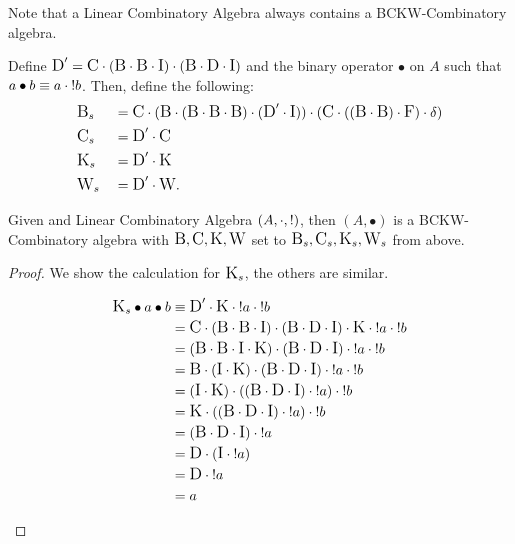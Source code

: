 Note that a Linear Combinatory Algebra always contains a BCKW-Combinatory algebra.

Define $\Dc' = \Cc\.(\Bc\.\Bc\.\Ic)\.(\Bc\.\Dc\.\Ic)$ and the binary operator $\bullet$ on $A$ such
that $a\bullet b \equiv a\.{!}b$. Then, define the following:
\begin{align*}
  &\Bc_s  &&=\Cc\.(\Bc\.(\Bc\.\Bc\.\Bc)\.(\Dc'\.\Ic))\.(\Cc\.((\Bc\.\Bc)\.\Fc)\.\dc)\\
  &\Cc_s  &&=\Dc'\.\Cc\\
  &\Kc_s  &&=\Dc'\.\Kc\\
  &\Wc_s  &&=\Dc'\.\Wc.
\end{align*}

\begin{lemma}\label{lem:linear_combinatory_algebra_has_a_bckw_algebra}
  Given and Linear Combinatory Algebra $(A,\.,{!})$, then $(A,\bullet)$ is a BCKW-Combinatory
  algebra with $\Bc,\Cc,\Kc,\Wc$ set to $\Bc_s,\Cc_s,\Kc_s,\Wc_s$ from above.
\end{lemma}
\begin{proof}
  We show the calculation for $\Kc_s$, the others are similar.
  \begin{singlespace}
    \begin{align*}
      \Kc_s\bullet a\bullet b &\equiv\Dc'\. \Kc \. {!}a \. {!}b\\
       &= \Cc\.(\Bc\.\Bc\.\Ic)\.(\Bc\.\Dc\.\Ic)\. \Kc \. {!}a \. {!}b\\
       &= (\Bc\.\Bc\.\Ic\. \Kc)\.(\Bc\.\Dc\.\Ic) \. {!}a \. {!}b\\
       &= \Bc\.(\Ic\. \Kc)\.(\Bc\.\Dc\.\Ic) \. {!}a \. {!}b\\
       &= (\Ic\. \Kc)\.((\Bc\.\Dc\.\Ic) \. {!}a) \. {!}b\\
       &= \Kc\.((\Bc\.\Dc\.\Ic) \. {!}a) \. {!}b\\
       &= (\Bc\.\Dc\.\Ic) \. {!}a\\
       &= \Dc\.(\Ic \. {!}a)\\
       &= \Dc\. {!}a\\
       &= a\\
    \end{align*}
  \end{singlespace}
  
\end{proof}




























